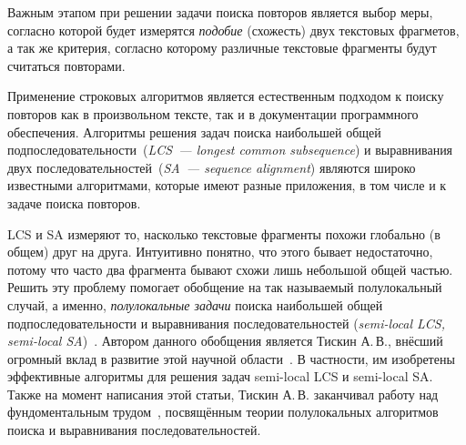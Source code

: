 Важным этапом при решении задачи поиска повторов является выбор
меры, согласно которой будет измерятся \emph{подобие} (схожесть) двух текстовых фрагметов, а так же критерия, согласно которому различные текстовые фрагменты будут считаться повторами.


Применение строковых алгоритмов является %
естественным подходом к поиску повторов как в произвольном тексте, так и в документации программного обеспечения.
Алгоритмы решения задач поиска наибольшей общей подпоследовательности~(\emph{LCS~--- longest common subsequence}) и выравнивания двух последовательностей~(\emph{SA~--- sequence alignment}) являются широко известными алгоритмами, которые имеют разные приложения, в том числе и к задаче поиска повторов.

{LCS} и {SA} измеряют то, насколько текстовые фрагменты похожи глобально (в общем) друг на друга. 
Интуитивно понятно, что этого бывает недостаточно, потому что часто два фрагмента бывают схожи лишь небольшой общей частью.
Решить эту проблему помогает обобщение на так называемый полулокальный случай, а именно, \emph{полулокальные задачи} поиска наибольшей общей подпоследовательности и выравнивания последовательностей (\emph{semi-local LCS, semi-local SA})~\cite{tiskin2006all}.
Автором данного обобщения является Тискин А.\,В., внёсший огромный вклад в развитие этой научной области~\cite{tiskin2015fast,tiskin2019bounded,krusche2009parallel,tiskin2006longest,tiskin2008semi,tiskin2011towards}.
В частности, им изобретены эффективные алгоритмы для решения задач {semi-local LCS} и {semi-local SA}.
Также на момент написания этой статьи, Тискин А.\,В. заканчивал работу над фундоментальным трудом~\cite{tiskin2006all}, посвящённым теории полулокальных алгоритмов поиска и выравнивания последовательностей.

